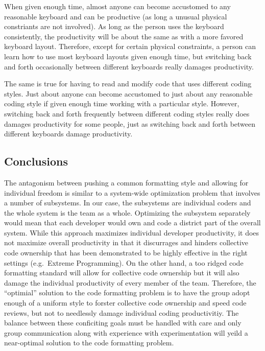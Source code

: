 When given enough time, almost anyone can become accustomed to any reasonable
keyboard and can be productive (as long a unusual physical constriants are not
involved).  As long as the person uses the keyboard consistently, the
productivity will be about the same as with a more favored keyboard layout.
Therefore, except for certain physical constraints, a person can learn how to
use most keyboard layouts given enough time, but switching back and forth
occasionally between different keyboards really damages productivity.

The same is true for having to read and modify code that uses different coding
styles.  Just about anyone can become accustomed to just about any reasonable
coding style if given enough time working with a particular style.  However,
switching back and forth frequently between different coding styles really
does damages productivity for some people, just as switching back and forth
between different keyboards damage productivity.

%
\subsection{Conclusions}
%

The antagonism between pushing a common formatting style and allowing for
individual freedom is similar to a system-wide optimization problem that
involves a number of subsystems.  In our case, the subsystems are individual
coders and the whole system is the team as a whole.  Optimizing the subsystem
separately would mean that each developer would own and code a district part
of the overall system.  While this approach maximizes individual developer
productivity, it does not maximize overall productivity in that it discurrages
and hinders collective code ownership that has been demonstrated to be highly
effective in the right settings (e.g.\ Extreme Programming).  On the other
hand, a too ridged code formatting standard will allow for collective code
ownership but it will also damage the individual productivity of every member
of the team.  Therefore, the ``optimial'' solution to the code formatting
problem is to have the group adopt enough of a uniform style to forster
collective code ownership and speed code reviews, but not to needlessly damage
individual coding productivitiy.  The balance between these conficiting goals
must be handled with care and only group communication along with experience
with experimentation will yeild a near-optimal solution to the code formatting
problem.

